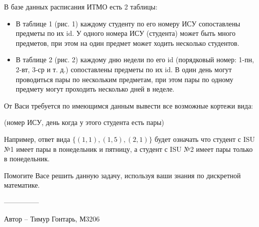 В базе данных расписания ИТМО есть 2 таблицы:
\begin{itemize}
    \item В таблице 1 (рис. 1) каждому студенту по его номеру ИСУ сопоставлены предметы по их id. У одного номера ИСУ (студента) может быть много предметов, при этом на один предмет может ходить несколько студентов.
    \item В таблице 2 (рис. 2) каждому дню недели по его id (порядковый номер: 1-пн, 2-вт, 3-ср и т. д.) сопоставлены предметы по их id. В один день могут проводиться пары по нескольким предметам, при этом пары по одному предмету могут проходить несколько дней в неделе.
\end{itemize}
От Васи требуется по имеющимся данным вывести все возможные кортежи вида:

\begin{center}(номер ИСУ, день когда у этого студента есть пары)\end{center}

Например, ответ вида $\{(1, 1), (1, 5), (2, 1)\}$ будет означать что студент с ISU №1 имеет пары в понедельник и пятницу, а студент с ISU №2 имеет пары только в понедельник.

Помогите Васе решить данную задачу, используя ваши знания по дискретной математике.

---------------

Автор -- Тимур Гонтарь, М3206